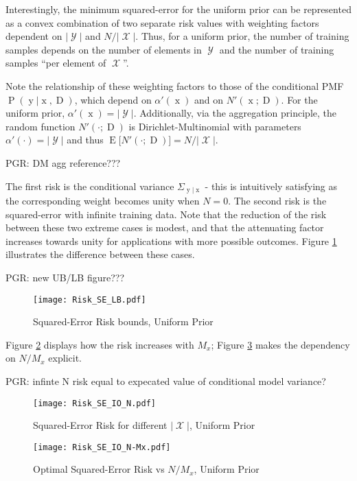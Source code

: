 \documentclass[12pt]{report}
\DeclareMathOperator{\xrm}{\mathrm{x}}
\DeclareMathOperator{\yrm}{\mathrm{y}}
\DeclareMathOperator{\Drm}{\mathrm{D}}
\DeclareMathOperator{\Prm}{\mathrm{P}}
\DeclareMathOperator{\Erm}{\mathrm{E}}
\DeclareMathOperator{\Xcal}{\mathcal{X}}
\DeclareMathOperator{\Ycal}{\mathcal{Y}}
\begin{document}
Interestingly, the minimum squared-error for the uniform prior can be represented as a convex combination of two separate risk values with weighting factors dependent on $|\Ycal|$ and $N/|\Xcal|$. Thus, for a uniform prior, the number of training samples depends  on the number of elements in $\Ycal$ and the number of training samples ``per element of $\Xcal$''.

Note the relationship of these weighting factors to those of the conditional PMF $\Prm(\yrm | \xrm,\Drm)$, which depend on $\alpha'(\xrm)$ and on $N'(\xrm;\Drm)$. For the uniform prior, $\alpha'(\xrm) = |\Ycal|$. Additionally, via the aggregation principle, the random function $N'(\cdot;\Drm)$ is Dirichlet-Multinomial with parameters $\alpha'(\cdot) = |\Ycal|$ and thus $\Erm\big[ N'(\cdot;\Drm) \big] = N/|\Xcal|$.

PGR: DM agg reference???

The first risk is the conditional variance $\Sigma_{\yrm|\xrm}$ - this is intuitively satisfying as the corresponding weight becomes unity when $N=0$. The second risk is the squared-error with infinite training data. Note that the reduction of the risk between these two extreme cases is modest, and that the attenuating factor increases towards unity for applications with more possible outcomes. Figure \ref{fig:Risk_SE_LB} illustrates the difference between these cases.

PGR: new UB/LB figure???

\begin{figure}
\centering
\texttt{[image: Risk\_SE\_LB.pdf]}
\caption{Squared-Error Risk bounds, Uniform Prior}
\label{fig:Risk_SE_LB}
\end{figure}

Figure \ref{fig:Risk_SE_IO_N} displays how the risk increases with $M_x$; Figure \ref{fig:Risk_SE_IO_N-Mx} makes the dependency on $N/M_x$ explicit.

PGR: infinte N risk equal to expecated value of conditional model variance?


\begin{figure}
\centering
\texttt{[image: Risk\_SE\_IO\_N.pdf]}
\caption{Squared-Error Risk for different $|\Xcal|$, Uniform Prior}
\label{fig:Risk_SE_IO_N}
\end{figure}

\begin{figure}
\centering
\texttt{[image: Risk\_SE\_IO\_N-Mx.pdf]}
\caption{Optimal Squared-Error Risk vs $N/M_x$, Uniform Prior}
\label{fig:Risk_SE_IO_N-Mx}
\end{figure}
\end{document}
